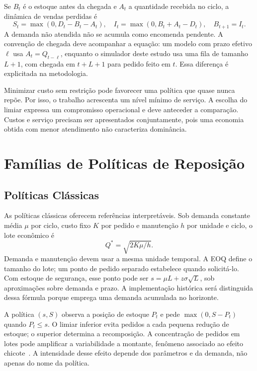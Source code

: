 Se $B_t$ é o estoque antes da chegada e $A_t$ a quantidade recebida no ciclo, a dinâmica de vendas perdidas é
\begin{equation}
S_t=\max(0,D_t-B_t-A_t),\quad
I_t=\max(0,B_t+A_t-D_t),\quad B_{t+1}=I_t.
\label{eq:balance}
\end{equation}
A demanda não atendida não se acumula como encomenda pendente. A convenção de chegada deve acompanhar a equação: um modelo com prazo efetivo $\ell$ usa $A_t=Q_{t-\ell}$, enquanto o simulador deste estudo usa uma fila de tamanho $L+1$, com chegada em $t+L+1$ para pedido feito em $t$. Essa diferença é explicitada na metodologia.

Minimizar custo sem restrição pode favorecer uma política que quase nunca repõe. Por isso, o trabalho acrescenta um nível mínimo de serviço. A escolha do limiar expressa um compromisso operacional e deve anteceder a comparação. Custos e serviço precisam ser apresentados conjuntamente, pois uma economia obtida com menor atendimento não caracteriza dominância.

\section{Famílias de Políticas de Reposição}
\label{sec:politicas_reposicao}
\subsection{Políticas Clássicas}
\label{sec:politicas_classicas}

As políticas clássicas oferecem referências interpretáveis. Sob demanda constante média $\mu$ por ciclo, custo fixo $K$ por pedido e manutenção $h$ por unidade e ciclo, o lote econômico é
\[
Q^*=\sqrt{2K\mu/h}.
\]
Demanda e manutenção devem usar a mesma unidade temporal. A EOQ define o tamanho do lote; um ponto de pedido separado estabelece quando solicitá-lo. Com estoque de segurança, esse ponto pode ser $s=\mu L+z\sigma\sqrt L$, sob aproximações sobre demanda e prazo. A implementação histórica será distinguida dessa fórmula porque emprega uma demanda acumulada no horizonte.

A política $(s,S)$ observa a posição de estoque $P_t$ e pede $\max(0,S-P_t)$ quando $P_t\leq s$. O limiar inferior evita pedidos a cada pequena redução de estoque; o superior determina a recomposição. A concentração de pedidos em lotes pode amplificar a variabilidade a montante, fenômeno associado ao efeito chicote~\citep{LeePadmanabhanWhang1997Bullwhip}. A intensidade desse efeito depende dos parâmetros e da demanda, não apenas do nome da política.

